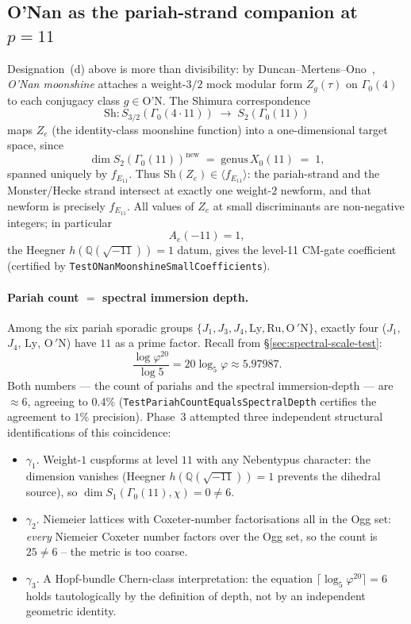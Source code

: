 \documentclass[11pt,a4paper]{article}
\theoremstyle{plain}
\theoremstyle{definition}
\theoremstyle{remark}
\numberwithin{equation}{section}
\begin{document}
\subsection*{O'Nan as the pariah-strand companion at $p=11$}
\label{sec:onan-pariah}

Designation~(d) above is more than divisibility: by Duncan--Mertens--Ono~\cite{DMO2017},
\emph{O'Nan moonshine} attaches a weight-$3/2$ mock modular form $Z_{g}(\tau)$
on $\Gamma_{0}(4)$ to each conjugacy class $g\in\text{O'N}$.
The Shimura correspondence
\[
  \mathrm{Sh}\colon S_{3/2}(\Gamma_{0}(4\cdot 11))\;\longrightarrow\;S_{2}(\Gamma_{0}(11))
\]
maps $Z_{e}$ (the identity-class moonshine function) into a one-dimensional
target space, since
\[
  \dim S_{2}(\Gamma_{0}(11))^{\mathrm{new}} \;=\; \mathrm{genus}\,X_{0}(11) \;=\; 1,
\]
spanned uniquely by $f_{E_{11}}$.  Thus $\mathrm{Sh}(Z_{e})\in\langle f_{E_{11}}\rangle$:
the pariah-strand and the Monster/Hecke strand intersect at exactly one weight-$2$
newform, and that newform is precisely $f_{E_{11}}$.  All values of $Z_{e}$ at small
discriminants are non-negative integers; in particular
\[
  A_{e}(-11) = 1,
\]
the Heegner $h(\mathbb Q(\sqrt{-11}))=1$ datum, gives the level-11 CM-gate
coefficient (certified by \texttt{TestONanMoonshineSmallCoefficients}).

\paragraph{Pariah count $=$ spectral immersion depth.}
Among the six pariah sporadic groups
$\{J_{1}, J_{3}, J_{4}, \mathrm{Ly}, \mathrm{Ru}, \mathrm{O\,'\!N}\}$,
exactly four ($J_{1}$, $J_{4}$, $\mathrm{Ly}$, $\mathrm{O\,'\!N}$) have $11$ as a prime factor.
Recall from \S\ref{sec:spectral-scale-test}:
\[
  \frac{\log\varphi^{20}}{\log 5} = 20\log_{5}\varphi \approx 5.97987.
\]
Both numbers --- the count of pariahs and the spectral immersion-depth ---
are $\approx 6$, agreeing to $0.4\%$ (\texttt{TestPariahCountEqualsSpectralDepth}
certifies the agreement to $1\%$ precision).  Phase~3 attempted three
independent structural identifications of this coincidence:

\begin{itemize}\itemsep0pt
\item $\gamma_{1}$. Weight-$1$ cuspforms at level $11$ with any Nebentypus
character: the dimension vanishes (Heegner $h(\mathbb Q(\sqrt{-11}))=1$
prevents the dihedral source), so $\dim S_{1}(\Gamma_{0}(11),\chi)=0\ne 6$.
\item $\gamma_{2}$. Niemeier lattices with Coxeter-number factorisations
all in the Ogg set: \emph{every} Niemeier Coxeter number factors over the
Ogg set, so the count is $25\ne 6$ -- the metric is too coarse.
\item $\gamma_{3}$. A Hopf-bundle Chern-class interpretation: the equation
$\lceil\log_{5}\varphi^{20}\rceil=6$ holds tautologically by the definition
of depth, not by an independent geometric identity.
\end{itemize}
\end{document}
